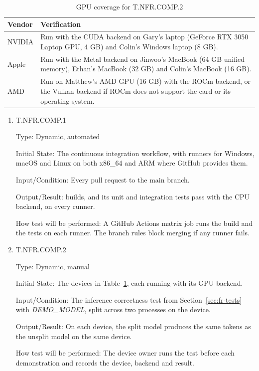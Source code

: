 \documentclass[12pt, titlepage]{article}
\begin{document}
\begin{table}[h]
\centering
\caption{GPU coverage for T.NFR.COMP.2}
\label{tab:gpu-coverage}
\begin{tabularx}{\textwidth}{lX}
\toprule
\textbf{Vendor} & \textbf{Verification} \\
\midrule
NVIDIA & Run with the CUDA backend on Gary's laptop (GeForce RTX 3050 Laptop
  GPU, 4 GB) and Colin's Windows laptop (8 GB). \\
Apple & Run with the Metal backend on Jinwoo's MacBook (64 GB unified memory),
  Ethan's MacBook (32 GB) and Colin's MacBook (16 GB). \\
AMD & Run on Matthew's AMD GPU (16 GB) with the ROCm backend, or the Vulkan
  backend if ROCm does not support the card or its operating system. \\
\bottomrule
\end{tabularx}
\end{table}

\begin{enumerate}

\item{T.NFR.COMP.1\\}
\label{T.NFR.COMP.1}

Type: Dynamic, automated

Initial State: The continuous integration workflow, with runners for Windows,
macOS and Linux on both x86\_64 and ARM where GitHub provides them.

Input/Condition: Every pull request to the main branch.

Output/Result: \progname{} builds, and its unit and integration tests pass with
the CPU backend, on every runner.

How test will be performed: A GitHub Actions matrix job runs the build and the
tests on each runner. The branch rules block merging if any runner fails.

\item{T.NFR.COMP.2\\}
\label{T.NFR.COMP.2}

Type: Dynamic, manual

Initial State: The devices in Table~\ref{tab:gpu-coverage}, each running
\progname{} with its GPU backend.

Input/Condition: The inference correctness test from
Section~\ref{sec:fr-tests} with \textit{DEMO\_MODEL}, split across two
processes on the device.

Output/Result: On each device, the split model produces the same tokens as the
unsplit model on the same device.

How test will be performed: The device owner runs the test before each
demonstration and records the device, backend and result.

\end{enumerate}
\end{document}
